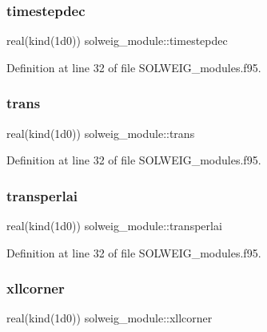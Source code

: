 \subsubsection{\texorpdfstring{timestepdec}{timestepdec}}
{\footnotesize\ttfamily real(kind(1d0)) solweig\+\_\+module\+::timestepdec}



Definition at line 32 of file S\+O\+L\+W\+E\+I\+G\+\_\+modules.\+f95.

\mbox{\label{namespacesolweig__module_af7c3a5fbe4297a3e22af0e2b350c0311}} 
\subsubsection{\texorpdfstring{trans}{trans}}
{\footnotesize\ttfamily real(kind(1d0)) solweig\+\_\+module\+::trans}



Definition at line 32 of file S\+O\+L\+W\+E\+I\+G\+\_\+modules.\+f95.

\mbox{\label{namespacesolweig__module_abd04dc024e2ed4adfe36e165d6e5a92e}} 
\subsubsection{\texorpdfstring{transperlai}{transperlai}}
{\footnotesize\ttfamily real(kind(1d0)) solweig\+\_\+module\+::transperlai}



Definition at line 32 of file S\+O\+L\+W\+E\+I\+G\+\_\+modules.\+f95.

\mbox{\label{namespacesolweig__module_aa077076360ddac9784d30693f88a4fc8}} 
\subsubsection{\texorpdfstring{xllcorner}{xllcorner}}
{\footnotesize\ttfamily real(kind(1d0)) solweig\+\_\+module\+::xllcorner}




